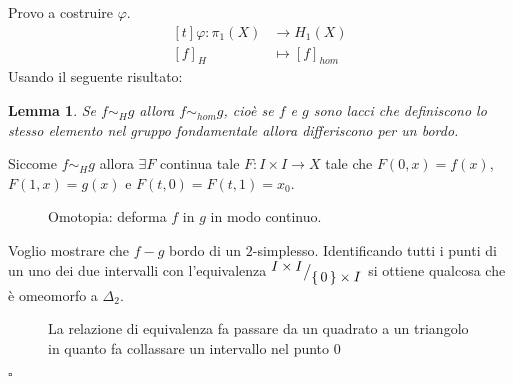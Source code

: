 \documentclass[10pt, twoside=false, x11names]{scrbook}
\newtheorem{lemma}[theorem]{Lemma}
\newenvironment{proof}{{\textbf{Dimostrazione}:}}{\hfill $\square$}
\renewcommand{\phi}{\varphi}
\newcommand*\quot[2]{{^{\textstyle #1}\big/_{\textstyle #2}}}
\begin{document}
Provo a costruire $ \phi $.
\[
  \begin{aligned}[t]
    \phi:  \pi_1(X) & \to H_1(X) \\
    [f]_H & \mapsto [f]_{hom}
  \end{aligned}
\]
Usando il seguente risultato:
\begin{lemma}
  Se $ f \sim_H g $ allora $ f \sim_{hom} g $, cioè se $ f $ e $ g $ sono lacci che definiscono
  lo stesso elemento nel gruppo fondamentale allora differiscono per un bordo.
\end{lemma}
\begin{proof}
  Siccome $ f \sim_{H} g $ allora $ \exists F $ continua tale $ F: I \times I \to X $ tale che $ F(0,x) = f(x) $,
  $ F(1,x) = g(x) $ e $ F(t,0) = F(t, 1) = x_0 $.
  \begin{figure}[htbp]
    \centering
    \caption{Omotopia: deforma $ f $ in $ g $ in modo continuo.}
    \label{fig:lez3:homotopy_f_g}
  \end{figure}

  Voglio mostrare che $ f - g $ bordo di un $ 2 $-simplesso.
  Identificando tutti i punti di un uno dei due intervalli con l'equivalenza $ \quot{I \times I}{\set{0} \times I} $
  si ottiene qualcosa che è omeomorfo a $ \Delta_2 $.
  \begin{figure}[htbp]
    \centering
    \caption{La relazione di equivalenza fa passare da un quadrato a un triangolo
    in quanto fa collassare un intervallo nel punto 0}
    \label{fig:lez3:homotopy_f_g_to_triangle}
  \end{figure}


\end{proof}
\end{document}
